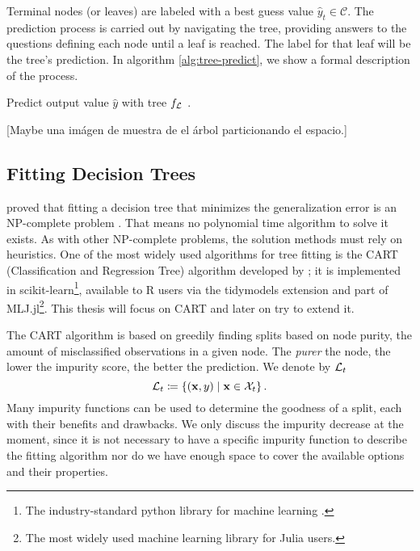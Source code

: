 Terminal nodes (or leaves) are labeled with a best guess value $\widehat{y}_t
\in \mathcal{C}$. The prediction process is carried out by navigating the tree,
providing answers to the questions defining each node until a leaf is reached.
The label for that leaf will be the tree's prediction. In algorithm
\ref{alg:tree-predict}, we show a formal description of the process.

\begin{algorithm}
    \caption[Tree prediction algorithm]{Predict output value $\widehat{y}$ with
        tree $f_{\mathcal{L}}$ \cite[Ch.~3.2]{louppe2014}.}
    \label{alg:tree-predict}
\end{algorithm}

[Maybe una imágen de muestra de el árbol particionando el espacio.]

\subsection{Fitting Decision Trees}
\citeauthor{hyafil1976} proved that fitting a decision tree that minimizes the
generalization error is an NP-complete problem \cite{hyafil1976}. That means no
polynomial time algorithm to solve it exists. As with other NP-complete
problems, the solution methods must rely on heuristics. One of the most widely
used algorithms for tree fitting is the CART (Classification and Regression
Tree) algorithm developed by \citeauthor{breiman2017} \cite{breiman2017}; it is
implemented in scikit-learn\footnote{The industry-standard python library for
machine learning \cite{louppe2014}.}, available to R users via the tidymodels
extension and part of MLJ.jl\footnote{The most widely used machine learning
library for Julia users.}. This thesis will focus on CART and later on try to
extend it.

The CART algorithm is based on greedily finding splits based on node purity, the
amount of misclassified observations in a given node. The \textit{purer} the
node, the lower the impurity score, the better the prediction. We denote by
$\mathcal{L}_t$
\begin{equation*}
    \mathcal{L}_t \coloneqq \left\{ (\mathbf{x}, y) \mid \mathbf{x} \in \mathcal{X}_t \right\}.
\end{equation*}
Many impurity functions can be used to determine the goodness of a split, each
with their benefits and drawbacks. We only discuss the impurity decrease at the
moment, since it is not necessary to have a specific impurity function to
describe the fitting algorithm nor do we have enough space to cover the
available options and their properties.


